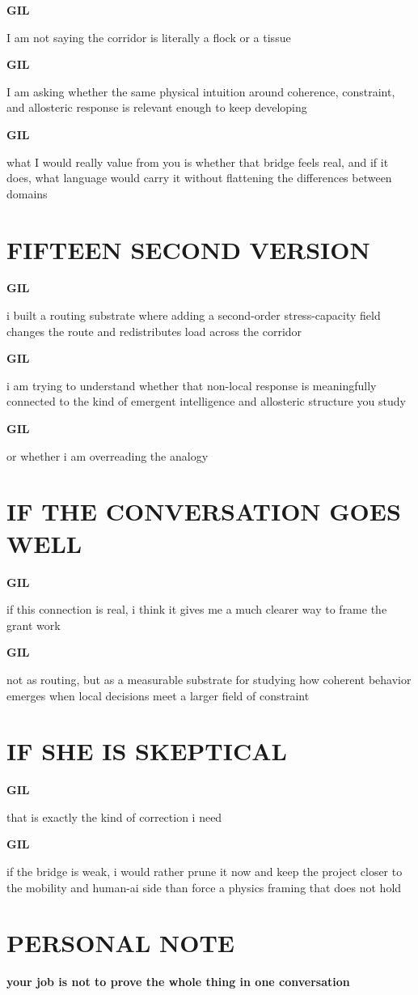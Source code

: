 \documentclass[11pt,letterpaper]{article}
\newcommand{\gil}[1]{\par\smallskip\textbf{GIL}\par #1}
\begin{document}
\gil{I am not saying the corridor is literally a flock or a tissue}

\gil{I am asking whether the same physical intuition around coherence, constraint, and allosteric response is relevant enough to keep developing}

\gil{what I would really value from you is whether that bridge feels real, and if it does, what language would carry it without flattening the differences between domains}

\section*{FIFTEEN SECOND VERSION}

\gil{i built a routing substrate where adding a second-order stress-capacity field changes the route and redistributes load across the corridor}

\gil{i am trying to understand whether that non-local response is meaningfully connected to the kind of emergent intelligence and allosteric structure you study}

\gil{or whether i am overreading the analogy}

\section*{IF THE CONVERSATION GOES WELL}

\gil{if this connection is real, i think it gives me a much clearer way to frame the grant work}

\gil{not as routing, but as a measurable substrate for studying how coherent behavior emerges when local decisions meet a larger field of constraint}

\section*{IF SHE IS SKEPTICAL}

\gil{that is exactly the kind of correction i need}

\gil{if the bridge is weak, i would rather prune it now and keep the project closer to the mobility and human-ai side than force a physics framing that does not hold}

\section*{PERSONAL NOTE}

\textbf{your job is not to prove the whole thing in one conversation}
\end{document}
